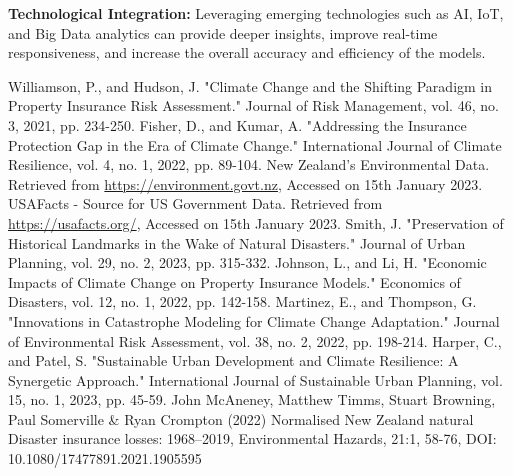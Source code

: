 \documentclass{mcmthesis}
\begin{document}
\textbf{Technological Integration:} Leveraging emerging technologies such as AI, IoT, and Big Data analytics can provide deeper insights, improve real-time responsiveness, and increase the overall accuracy and efficiency of the models.

\begin{thebibliography}{99}
    
     Williamson, P., and Hudson, J. "Climate Change and the Shifting Paradigm in Property Insurance Risk Assessment." Journal of Risk Management, vol. 46, no. 3, 2021, pp. 234-250.
     Fisher, D., and Kumar, A. "Addressing the Insurance Protection Gap in the Era of Climate Change." International Journal of Climate Resilience, vol. 4, no. 1, 2022, pp. 89-104.
     New Zealand's Environmental Data. Retrieved from \url{https://environment.govt.nz}, Accessed on 15th January 2023.
     USAFacts - Source for US Government Data. Retrieved from \url{https://usafacts.org/}, Accessed on 15th January 2023.
     Smith, J. "Preservation of Historical Landmarks in the Wake of Natural Disasters." Journal of Urban Planning, vol. 29, no. 2, 2023, pp. 315-332.
     Johnson, L., and Li, H. "Economic Impacts of Climate Change on Property Insurance Models." Economics of Disasters, vol. 12, no. 1, 2022, pp. 142-158.
     Martinez, E., and Thompson, G. "Innovations in Catastrophe Modeling for Climate Change Adaptation." Journal of Environmental Risk Assessment, vol. 38, no. 2, 2022, pp. 198-214.
     Harper, C., and Patel, S. "Sustainable Urban Development and Climate Resilience: A Synergetic Approach." International Journal of Sustainable Urban Planning, vol. 15, no. 1, 2023, pp. 45-59.
     John McAneney, Matthew Timms, Stuart Browning, Paul Somerville \& Ryan Crompton (2022) Normalised New Zealand natural Disaster insurance losses: 1968–2019, Environmental Hazards, 21:1, 58-76, DOI: 10.1080/17477891.2021.1905595

    \end{thebibliography}
\newpage
\end{document}
